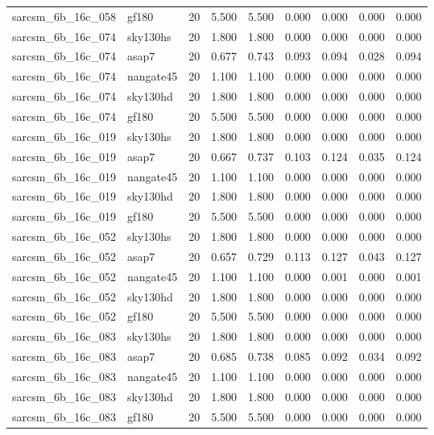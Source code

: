 \begin{tabular}{llrrrrrrr}
sarcsm\_6b\_16c\_058 & gf180 & 20 & 5.500 & 5.500 & 0.000 & 0.000 & 0.000 & 0.000 \\
sarcsm\_6b\_16c\_074 & sky130hs & 20 & 1.800 & 1.800 & 0.000 & 0.000 & 0.000 & 0.000 \\
sarcsm\_6b\_16c\_074 & asap7 & 20 & 0.677 & 0.743 & 0.093 & 0.094 & 0.028 & 0.094 \\
sarcsm\_6b\_16c\_074 & nangate45 & 20 & 1.100 & 1.100 & 0.000 & 0.000 & 0.000 & 0.000 \\
sarcsm\_6b\_16c\_074 & sky130hd & 20 & 1.800 & 1.800 & 0.000 & 0.000 & 0.000 & 0.000 \\
sarcsm\_6b\_16c\_074 & gf180 & 20 & 5.500 & 5.500 & 0.000 & 0.000 & 0.000 & 0.000 \\
sarcsm\_6b\_16c\_019 & sky130hs & 20 & 1.800 & 1.800 & 0.000 & 0.000 & 0.000 & 0.000 \\
sarcsm\_6b\_16c\_019 & asap7 & 20 & 0.667 & 0.737 & 0.103 & 0.124 & 0.035 & 0.124 \\
sarcsm\_6b\_16c\_019 & nangate45 & 20 & 1.100 & 1.100 & 0.000 & 0.000 & 0.000 & 0.000 \\
sarcsm\_6b\_16c\_019 & sky130hd & 20 & 1.800 & 1.800 & 0.000 & 0.000 & 0.000 & 0.000 \\
sarcsm\_6b\_16c\_019 & gf180 & 20 & 5.500 & 5.500 & 0.000 & 0.000 & 0.000 & 0.000 \\
sarcsm\_6b\_16c\_052 & sky130hs & 20 & 1.800 & 1.800 & 0.000 & 0.000 & 0.000 & 0.000 \\
sarcsm\_6b\_16c\_052 & asap7 & 20 & 0.657 & 0.729 & 0.113 & 0.127 & 0.043 & 0.127 \\
sarcsm\_6b\_16c\_052 & nangate45 & 20 & 1.100 & 1.100 & 0.000 & 0.001 & 0.000 & 0.001 \\
sarcsm\_6b\_16c\_052 & sky130hd & 20 & 1.800 & 1.800 & 0.000 & 0.000 & 0.000 & 0.000 \\
sarcsm\_6b\_16c\_052 & gf180 & 20 & 5.500 & 5.500 & 0.000 & 0.000 & 0.000 & 0.000 \\
sarcsm\_6b\_16c\_083 & sky130hs & 20 & 1.800 & 1.800 & 0.000 & 0.000 & 0.000 & 0.000 \\
sarcsm\_6b\_16c\_083 & asap7 & 20 & 0.685 & 0.738 & 0.085 & 0.092 & 0.034 & 0.092 \\
sarcsm\_6b\_16c\_083 & nangate45 & 20 & 1.100 & 1.100 & 0.000 & 0.000 & 0.000 & 0.000 \\
sarcsm\_6b\_16c\_083 & sky130hd & 20 & 1.800 & 1.800 & 0.000 & 0.000 & 0.000 & 0.000 \\
sarcsm\_6b\_16c\_083 & gf180 & 20 & 5.500 & 5.500 & 0.000 & 0.000 & 0.000 & 0.000 \\

\end{tabular}
